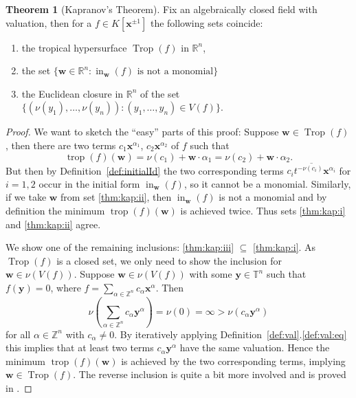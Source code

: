\documentclass[
  paper=a4,
  titlepage,
  bibliography=totoc,
  pagesize=pdftex
]{scrartcl}
\numberwithin{figure}{section}
\numberwithin{equation}{section}
\numberwithin{table}{section}
\newcommand*\setZ{\mathds{Z}}
\newcommand*\setR{\mathds{R}}
\newcommand*\setT{\mathds{T}}
\let\vec\mathbf
\DeclareMathOperator{\Trop}{Trop}
\DeclareMathOperator{\trop}{trop}
\DeclareMathOperator{\initial}{in}
\theoremstyle{definition}
\newtheorem{theorem}[definition]{Theorem}
\numberwithin{definition}{section}
\begin{document}
\begin{theorem}[Kapranov's Theorem]
  \label{thm:kapranov}
  Fix an algebraically closed field with valuation, then for a $f \in K[\vec x^{\pm1}]$
  the following sets coincide:
  \begin{enumerate}
    \item the tropical hypersurface $\Trop(f)$ in $\setR^n$,
      \label{thm:kap:i}
    \item the set $\{ \vec w \in \setR^n : \initial_{\vec w}(f) \text{ is not a
      monomial}\}$
      \label{thm:kap:ii}
    \item the Euclidean closure in $\setR^n$ of the set $\{ (\nu(y_1), \dots, \nu(y_n)) :
      (y_1,\dots,y_n) \in V(f) \}$.
      \label{thm:kap:iii}
  \end{enumerate}
  \begin{proof}
    We want to sketch the \enquote{easy} parts of this proof: Suppose $\vec w \in
    \Trop(f)$, then there are two terms $c_1 \vec x^{\alpha_1}$, $c_2 \vec x^{\alpha_2}$
    of $f$ such that
    \[
      \trop(f)(\vec w) = \nu(c_1) + \vec w \cdot \alpha_1 = \nu(c_2) + \vec w \cdot \alpha_2.
    \]
    But then by Definition~\ref{def:initialId} the two corresponding terms
    $\overline{c_it^{-\nu(c_i)}\vec x^{\alpha_i}}$ for $i=1,2$ occur in the initial form
    $\initial_{\vec w}(f)$, so it cannot be a monomial. Similarly, if we take $\vec w$
    from set \ref{thm:kap:ii}, then $\initial_{\vec w}(f)$ is not a monomial and by
    definition the minimum $\trop(f)(\vec w)$ is achieved twice. Thus sets \ref{thm:kap:i}
    and \ref{thm:kap:ii} agree.

    We show one of the remaining inclusions: \ref{thm:kap:iii} $\subseteq$
    \ref{thm:kap:i}. As $\Trop(f)$ is a closed set, we only need to show the inclusion for
    $\vec w \in \nu(V(f))$. Suppose $\vec w \in \nu(V(f))$ with some $\vec y \in \setT^n$
    such that $f(\vec y) = 0$, where $f = \sum_{\alpha \in \setZ^n} c_\alpha \vec
    x^\alpha$. Then
    \[
      \nu \left( \sum_{\alpha \in \setZ^n} c_\alpha \vec y^\alpha \right) = \nu(0) =
      \infty > \nu(c_\alpha \vec y^\alpha)
    \]
    for all $\alpha \in \setZ^n$ with $c_\alpha \neq 0$. By iteratively applying
    Definition~\ref{def:val}.\ref{def:val:eq} this implies that at least two terms
    $c_\alpha \vec y^\alpha$ have the same valuation. Hence the minimum $\trop(f)(\vec w)$
    is achieved by the two corresponding terms, implying $\vec w \in \Trop(f)$. The
    reverse inclusion is quite a bit more involved and is proved in
    \cite[Proposition~3.1.5]{sturmMacTrop}.
  \end{proof}
\end{theorem}
\end{document}
